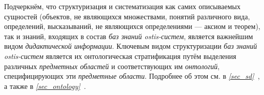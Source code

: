 \vspace{-\baselineskip}

\begin{SCn}
\end{SCn}

\vspace{-\baselineskip}

\begin{SCn}
\end{SCn}

\vspace{-\baselineskip}

\begin{SCn}
\end{SCn}

\vspace{-\baselineskip}

\begin{SCn}
\end{SCn}

\vspace{-\baselineskip}

\begin{SCn}
\end{SCn}

\vspace{-\baselineskip}

\begin{SCn}
\end{SCn}

Подчеркнём, что структуризация и систематизация как самих описываемых сущностей (объектов, не являющихся множествами, понятий различного вида, определений, высказываний, не являющихся определениями --- аксиом и теорем), так и знаний, входящих в состав \textit{баз знаний ostis-систем}, является важнейшим видом \textit{дидактической информации}. Ключевым видом структуризации \textit{баз знаний ostis-систем} является их онтологическая стратификация путём выделения различных \textit{предметных областей} и соответствующих им \textit{онтологий}, специфицирующих эти \textit{предметные области}. Подробнее об этом см. в \textit{\ref{sec_sd}~}, а также в \textit{\ref{sec_ontology}~}.


